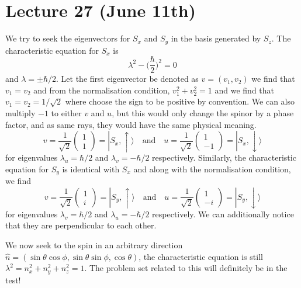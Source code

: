 \section{Lecture 27 (June 11th)}
\begin{thm}
We try to seek the eigenvectors for $S_{x}$ and $S_{y}$ in the basis generated by $S_{z}$. The characteristic equation for $S_{x}$ is
\[\lambda ^2-\Big(\dfrac{\hbar}{2}\Big)^2=0\]
and $\lambda=\pm \hbar /2$. Let the first eigenvector be denoted as $v=(v_1,v_2)$ we find that $v_1=v_2$ and from the normalisation condition, $v_1^2+v_2^2=1$ and we find that $v_1=v_2=1/\sqrt{2}$ where choose the sign to be positive by convention. We can also multiply $-1$ to either $v$ and $u$, but this would only change the spinor by a phase factor, and as same rays, they would have the same physical meaning.
\[v=\dfrac{1}{\sqrt{2}}\begin{pmatrix}
1\\1
\end{pmatrix}=|S_{x},\uparrow\rangle \quad \mathrm{and}\quad u=\dfrac{1}{\sqrt{2}}\begin{pmatrix}
1\\-1
\end{pmatrix}=|S_{x},\downarrow\rangle 

\]
for eigenvalues $\lambda_u=\hbar /2$ and $\lambda_v=-\hbar /2$ respectively. Similarly, the characteristic equation for $S_{y}$ is identical with $S_{x}$ and along with the normalisation condition, we find 
\[v=\dfrac{1}{\sqrt{2}}\begin{pmatrix}
1\\i
\end{pmatrix}=|S_{y},\uparrow\rangle \quad \mathrm{and}\quad u=\dfrac{1}{\sqrt{2}}\begin{pmatrix}
1\\-i
\end{pmatrix}=|S_{y},\downarrow\rangle 
\]
for eigenvalues $\lambda_v=\hbar /2$ and $\lambda_u=-\hbar /2$ respectively. We can additionally notice that they are perpendicular to each other.
\end{thm}
\vspace{2ex}
\begin{prop}
We now seek to the spin in an arbitrary direction $\hat{n}=(\sin \theta \cos \phi ,\sin \theta \sin \phi ,\cos \theta )$, the characteristic equation is still $\lambda^2=n_{x}^2+n_{y}^2+n_{z}^2=1$. The problem set related to this will definitely be in the test!
\end{prop}
\vspace{2ex}
